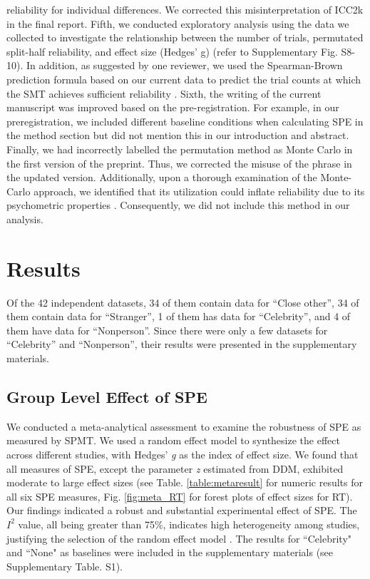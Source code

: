 \documentclass[sn-apa]{sn-jnl}%
\theoremstyle{thmstyleone}%
\theoremstyle{thmstyletwo}%
\theoremstyle{thmstylethree}%
\begin{document}
reliability for individual differences. We corrected this misinterpretation of ICC2k in the final report. Fifth, we conducted exploratory analysis using the data we collected to investigate the relationship between the number of trials, permutated split-half reliability, and effect size (Hedges’ g) (refer to Supplementary Fig. S8-10). In addition, as suggested by one reviewer, we used the Spearman-Brown prediction formula based on our current data to predict the trial counts at which the SMT achieves sufficient reliability \parencite{pronk2023can}. Sixth, the writing of the current manuscript was improved based on the pre-registration. For example, in our preregistration, we included different baseline conditions when calculating SPE in the method section but did not mention this in our introduction and abstract. Finally, we had incorrectly labelled the permutation method as Monte Carlo in the first version of the preprint. Thus, we corrected the misuse of the phrase in the updated version. Additionally, upon a thorough examination of the Monte-Carlo approach, we identified that its utilization could inflate reliability due to its psychometric properties \parencite{kahveci2022reliability}. Consequently, we did not include this method in our analysis. 

\section{Results}\label{sec4}

Of the 42 independent datasets, 34 of them contain data for ``Close other”, 34 of them contain data for ``Stranger”, 1 of them has data for ``Celebrity”, and 4 of them have data for ``Nonperson”. Since there were only a few datasets for ``Celebrity” and ``Nonperson”, their results were presented in the supplementary materials. 

\subsection{Group Level Effect of SPE}\label{subsec:groupeff}

We conducted a meta-analytical assessment to examine the robustness of SPE as measured by SPMT. We used a random effect model to synthesize the effect across different studies, with Hedges’ \textit{g} as the index of effect size. We found that all measures of SPE, except the parameter \textit{z} estimated from DDM, exhibited moderate to large effect sizes (see Table. \ref{table:metaresult} for numeric results for all six SPE measures, Fig. \ref{fig:meta_RT} for forest plots of effect sizes for RT). Our findings indicated a robust and substantial experimental effect of SPE. The $I^{2}$ value, all being greater than 75\%, indicates high heterogeneity among studies, justifying the selection of the random effect model \parencite{borenstein2021introduction}.  The results for ``Celebrity" and ``None" as baselines were included in the supplementary materials (see Supplementary Table. S1). 
\end{document}
